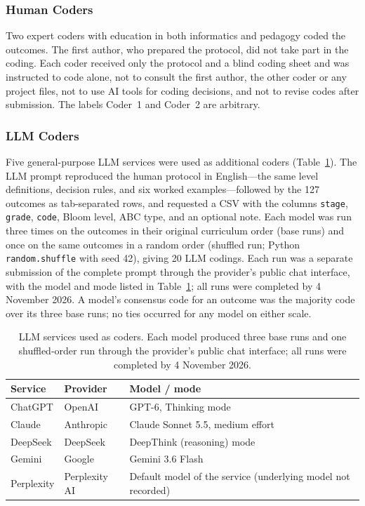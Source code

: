 \documentclass[journal,article,submit,pdftex,moreauthors]{Definitions/mdpi}
\begin{document}
\subsubsection{Human Coders}

Two expert coders with education in both informatics and pedagogy coded the outcomes. The first author, who prepared the protocol, did not take part in the coding. Each coder received only the protocol and a blind coding sheet and was instructed to code alone, not to consult the first author, the other coder or any project files, not to use AI tools for coding decisions, and not to revise codes after submission. The labels Coder~1 and Coder~2 are arbitrary.

\subsubsection{LLM Coders}

Five general-purpose LLM services were used as additional coders (Table~\ref{tab:llms}). The LLM prompt reproduced the human protocol in English---the same level definitions, decision rules, and six worked examples---followed by the 127 outcomes as tab-separated rows, and requested a CSV with the columns \texttt{stage}, \texttt{grade}, \texttt{code}, Bloom level, ABC type, and an optional note. Each model was run three times on the outcomes in their original curriculum order (base runs) and once on the same outcomes in a random order (shuffled run; Python \texttt{random.shuffle} with seed 42), giving 20 LLM codings. Each run was a separate submission of the complete prompt through the provider's public chat interface, with the model and mode listed in Table~\ref{tab:llms}; all runs were completed by 4 November 2026. A model's consensus code for an outcome was the majority code over its three base runs; no ties occurred for any model on either scale.

\begin{table}[H]
\caption{LLM services used as coders. Each model produced three base runs and one shuffled-order run through the provider's public chat interface; all runs were completed by 4 November 2026.}
\label{tab:llms}
\centering
\footnotesize
\begin{tabular}{lll}
\toprule
\textbf{Service} & \textbf{Provider} & \textbf{Model / mode} \\
\midrule
ChatGPT & OpenAI & GPT-6, Thinking mode \\
Claude & Anthropic & Claude Sonnet 5.5, medium effort \\
DeepSeek & DeepSeek & DeepThink (reasoning) mode \\
Gemini & Google & Gemini 3.6 Flash \\
Perplexity & Perplexity AI & Default model of the service (underlying model not recorded) \\
\bottomrule
\end{tabular}
\end{table}
\end{document}
